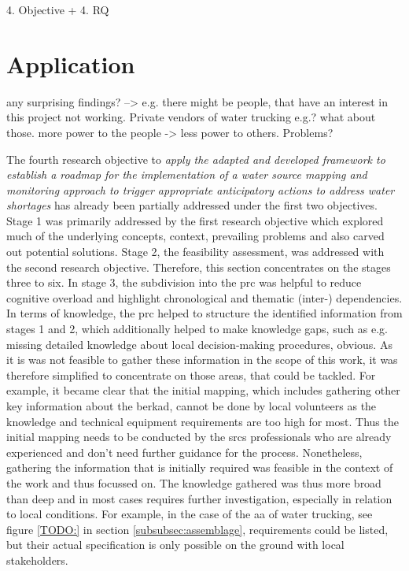 4. Objective + 4. RQ
\section{Application}


any surprising findings? 
--> e.g. there might be people, that have an interest in this project not working. Private vendors of water trucking e.g.? what about those.
more power to the people -> less power to others. Problems?



The fourth research objective to \textit{apply the adapted and developed framework to establish a roadmap for the implementation of a water source mapping and monitoring approach to trigger appropriate anticipatory actions to address water shortages} has already been partially addressed under the first two objectives. Stage 1 was primarily addressed by the first research objective which explored much of the underlying concepts, context, prevailing problems and also carved out potential solutions. Stage 2, the feasibility assessment, was addressed with the second research objective. Therefore, this section concentrates on the stages three to six.\newline
In stage 3, the subdivision into the \acrshort{prc} was helpful to reduce cognitive overload and highlight chronological and thematic (inter-) dependencies. In terms of knowledge, the \acrshort{prc} helped to structure the identified information from stages 1 and 2, which additionally helped to make knowledge gaps, such as e.g. missing detailed knowledge about local decision-making procedures, obvious. As it is was not feasible to gather these information in the scope of this work, it was therefore simplified to concentrate on those areas, that could be tackled. For example, it became clear that the initial mapping, which includes gathering other key information about the berkad, cannot be done by local volunteers as the knowledge and technical equipment requirements are too high for most. Thus the initial mapping needs to be conducted by the \acrshort{srcs} professionals who are already experienced and don't need further guidance for the process. Nonetheless, gathering the information that is initially required was feasible in the context of the work and thus focussed on. The knowledge gathered was thus more broad than deep and in most cases requires further investigation, especially in relation to local conditions. For example, in the case of the \acrshort{aa} of water trucking, see figure \ref{TODO:} in section \ref{subsubsec:assemblage}, requirements could be listed, but their actual specification is only possible on the ground with local stakeholders.\newline
